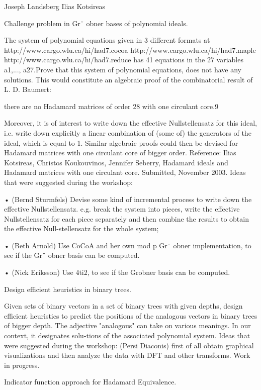 \documentclass[11pt]{article}
\begin{document}
Joseph Landsberg Ilias Kotsireas

Challenge problem in Gr¨ obner bases of polynomial ideals.

The system of polynomial equations given in 3 different formats at http://www.cargo.wlu.ca/hi/had7.cocoa http://www.cargo.wlu.ca/hi/had7.maple http://www.cargo.wlu.ca/hi/had7.reduce has 41 equations in the 27 variables a1,..., a27.Prove that this system of polynomial equations, does not have any solutions. This would constitute an algebraic proof of the combinatorial result of L. D. Baumert:

there are no Hadamard matrices of order 28 with one circulant core.9

Moreover, it is of interest to write down the effective Nullstellensatz for this ideal, i.e. write down explicitly a linear combination of (some of) the generators of the ideal, which is equal to 1. Similar algebraic proofs could then be devised for Hadamard matrices with one circulant core of bigger order. Reference: Ilias Kotsireas, Christos Koukouvinos, Jennifer Seberry, Hadamard ideals and Hadamard matrices with one circulant core. Submitted, November 2003. Ideas that were suggested during the workshop:

• (Bernd Sturmfels) Devise some kind of incremental process to write down the effective Nullstellensatz. e.g. break the system into pieces, write the effective Nullstellensatz for each piece separately and then combine the results to obtain the effective Null-stellensatz for the whole system;

• (Beth Arnold) Use CoCoA and her own mod p Gr¨ obner implementation, to see if the Gr¨ obner basis can be computed.

• (Nick Eriksson) Use 4ti2, to see if the Grobner basis can be computed.

Design efficient heuristics in binary trees.

Given sets of binary vectors in a set of binary trees with given depths, design efficient heuristics to predict the positions of the analogous vectors in binary trees of bigger depth. The adjective "analogous" can take on various meanings. In our context, it designates solu-tions of the associated polynomial system. Ideas that were suggested during the workshop: (Persi Diaconis) first of all obtain graphical visualizations and then analyze the data with DFT and other transforms. Work in progress.

Indicator function approach for Hadamard Equivalence.
\end{document}
